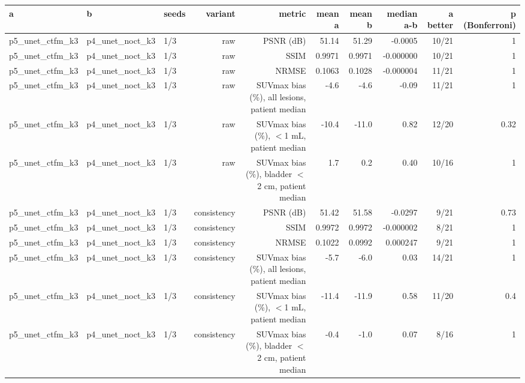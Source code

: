 \begin{tabular}{lllrrrrrrr}
\toprule
a & b & seeds & variant & metric & mean a & mean b & median a-b & a better & p (Bonferroni) \\
\midrule
p5\_unet\_ctfm\_k3 & p4\_unet\_noct\_k3 & 1/3 & raw & PSNR (dB) & 51.14 & 51.29 & -0.0005 & 10/21 & 1 \\
p5\_unet\_ctfm\_k3 & p4\_unet\_noct\_k3 & 1/3 & raw & SSIM & 0.9971 & 0.9971 & -0.000000 & 10/21 & 1 \\
p5\_unet\_ctfm\_k3 & p4\_unet\_noct\_k3 & 1/3 & raw & NRMSE & 0.1063 & 0.1028 & -0.000004 & 11/21 & 1 \\
p5\_unet\_ctfm\_k3 & p4\_unet\_noct\_k3 & 1/3 & raw & SUVmax bias (\%), all lesions, patient median & -4.6 & -4.6 & -0.09 & 11/21 & 1 \\
p5\_unet\_ctfm\_k3 & p4\_unet\_noct\_k3 & 1/3 & raw & SUVmax bias (\%), $<$1 mL, patient median & -10.4 & -11.0 & 0.82 & 12/20 & 0.32 \\
p5\_unet\_ctfm\_k3 & p4\_unet\_noct\_k3 & 1/3 & raw & SUVmax bias (\%), bladder $<$2 cm, patient median & 1.7 & 0.2 & 0.40 & 10/16 & 1 \\
p5\_unet\_ctfm\_k3 & p4\_unet\_noct\_k3 & 1/3 & consistency & PSNR (dB) & 51.42 & 51.58 & -0.0297 & 9/21 & 0.73 \\
p5\_unet\_ctfm\_k3 & p4\_unet\_noct\_k3 & 1/3 & consistency & SSIM & 0.9972 & 0.9972 & -0.000002 & 8/21 & 1 \\
p5\_unet\_ctfm\_k3 & p4\_unet\_noct\_k3 & 1/3 & consistency & NRMSE & 0.1022 & 0.0992 & 0.000247 & 9/21 & 1 \\
p5\_unet\_ctfm\_k3 & p4\_unet\_noct\_k3 & 1/3 & consistency & SUVmax bias (\%), all lesions, patient median & -5.7 & -6.0 & 0.03 & 14/21 & 1 \\
p5\_unet\_ctfm\_k3 & p4\_unet\_noct\_k3 & 1/3 & consistency & SUVmax bias (\%), $<$1 mL, patient median & -11.4 & -11.9 & 0.58 & 11/20 & 0.4 \\
p5\_unet\_ctfm\_k3 & p4\_unet\_noct\_k3 & 1/3 & consistency & SUVmax bias (\%), bladder $<$2 cm, patient median & -0.4 & -1.0 & 0.07 & 8/16 & 1 \\
\bottomrule
\end{tabular}
